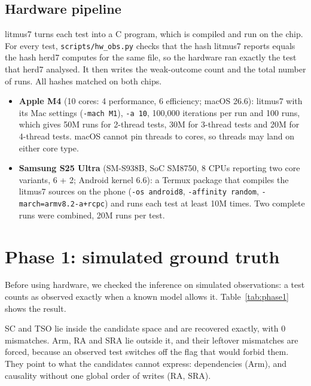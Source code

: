 \documentclass[11pt]{article}
\begin{document}
\subsection{Hardware pipeline}
litmus7 turns each test into a C program, which is compiled and run on the chip. For every test,
\texttt{scripts/hw\_obs.py} checks that the hash litmus7 reports equals the hash herd7 computes for the
same file, so the hardware ran exactly the test that herd7 analysed. It then writes the weak-outcome
count and the total number of runs. All hashes matched on both chips.
\begin{itemize}
  \item \textbf{Apple M4} (10 cores: 4 performance, 6 efficiency; macOS 26.6): litmus7 with its Mac
        settings (\texttt{-mach M1}), \texttt{-a 10}, 100{,}000 iterations per run and 100 runs, which
        gives 50M runs for 2-thread tests, 30M for 3-thread tests and 20M for 4-thread tests. macOS
        cannot pin threads to cores, so threads may land on either core type.
  \item \textbf{Samsung S25 Ultra} (SM-S938B, SoC SM8750, 8 CPUs reporting two core variants, 6 + 2;
        Android kernel 6.6): a Termux package that compiles the litmus7 sources on the phone
        (\texttt{-os android8}, \texttt{-affinity random}, \texttt{-march=armv8.2-a+rcpc}) and runs each test
        at least 10M times. Two complete runs were combined, 20M runs per test.
\end{itemize}

\section{Phase 1: simulated ground truth}\label{sec:phase1}
Before using hardware, we checked the inference on simulated observations: a test counts as
observed exactly when a known model allows it. Table~\ref{tab:phase1} shows the result.

\begin{table}[h]
\centering\small

\caption{Phase 1. Each row uses one model as the ``hardware''.}
\label{tab:phase1}
\end{table}

SC and TSO lie inside the candidate space and are recovered exactly, with 0 mismatches. Arm, RA and
SRA lie outside it, and their leftover mismatches are forced, because an observed test switches off
the flag that would forbid them. They point to what the candidates cannot express: dependencies (Arm),
and causality without one global order of writes (RA, SRA).
\end{document}
